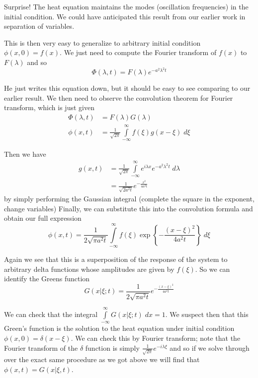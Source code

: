 \documentclass[10pt]{report}
\begin{document}
Surprise! The heat equation maintains the modes (oscillation frequencies) in the initial condition. We could have anticipated this result from our earlier work in separation of variables.

This is then very easy to generalize to arbitrary initial condition $\phi(x,0) = f(x)$. We just need to compute the Fourier transform of $f(x)$ to $F(\lambda)$ and so
\begin{equation}
    \Phi(\lambda,t) = F(\lambda) e^{-a^2 \lambda^2 t}
\end{equation}

He just writes this equation down, but it should be easy to see comparing to our earlier result. We then need to observe the convolution theorem for Fourier transform, which is just given
\begin{align}
    \Phi(\lambda,t) &= F(\lambda)G(\lambda)\\
    \phi(x,t) &= \frac{1}{\sqrt{2\pi}}\int\limits_{-\infty}^{\infty}f(\xi) g(x-\xi)\;d\xi
\end{align}

Then we have
\begin{align}
    g(x,t) &= \frac{1}{\sqrt{2\pi}}\int\limits_{-\infty}^{\infty}e^{i\lambda x}e^{-a^2 \lambda^2 t}\;d\lambda\\
    &= \frac{1}{\sqrt{2a^2t}}e^{-\frac{x^2}{4a^2t}}
\end{align}
by simply performing the Gaussian integral (complete the square in the exponent, change variables) Finally, we can substitute this into the convolution formula and obtain our full expression
\begin{equation}
    \phi(x,t) = \frac{1}{2\sqrt{\pi a^2 t}}\int\limits_{-\infty}^{\infty}f(\xi)\exp\left\{ -\frac{(x-\xi)^2}{4a^2t} \right\}\;d\xi\label{5.7.FourierSol}
\end{equation}

Again we see that this is a superposition of the response of the system to arbitrary delta functions whose amplitudes are given by $f(\xi)$. So we can identify the Greens function
\begin{equation}
    G(x|\xi;t) = \frac{1}{2\sqrt{\pi a^2 t}}e^{-\frac{(x-\xi)^2}{4a^2 t}}
\end{equation}

We can check that the integral $\int\limits_{-\infty}^{\infty}G(x|\xi;t)\;dx = 1$. We suspect then that this Green's function is the solution to the heat equation under initial condition $\phi(x,0) = \delta(x-\xi)$. We can check this by Fourier transform; note that the Fourier transform of the $\delta$ function is simply $\frac{1}{\sqrt{2\pi}}e^{-i\lambda \xi}$ and so if we solve through over the exact same procedure as we got above we will find that $\phi(x,t) = G(x|\xi,t)$.
\end{document}
